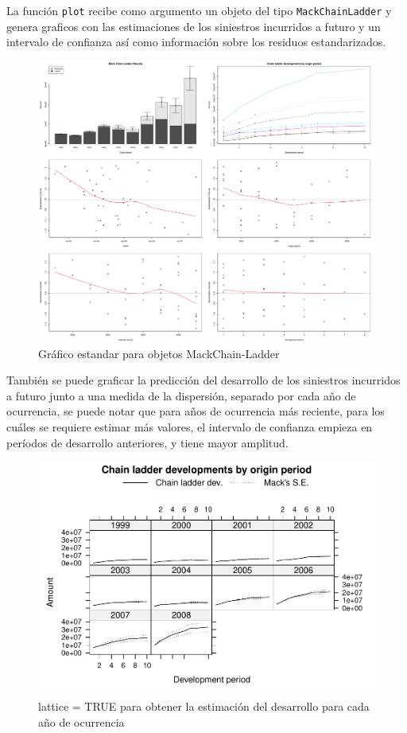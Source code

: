 \documentclass[
  12pt,
]{article}
\begin{document}
La función \texttt{plot} recibe como argumento un objeto del tipo
\texttt{MackChainLadder} y genera graficos con las estimaciones de los
siniestros incurridos a futuro y un intervalo de confianza así como
información sobre los residuos estandarizados.

\begin{figure}
\includegraphics[width=1\linewidth]{informe_files/figure-latex/unnamed-chunk-18-1} \caption{Gráfico estandar para objetos MackChain-Ladder}\label{fig:unnamed-chunk-18}
\end{figure}

También se puede graficar la predicción del desarrollo de los siniestros
incurridos a futuro junto a una medida de la dispersión, separado por
cada año de ocurrencia, se puede notar que para años de ocurrencia más
reciente, para los cuáles se requiere estimar más valores, el intervalo
de confianza empieza en períodos de desarrollo anteriores, y tiene mayor
amplitud.

\begin{figure}
\centering
\includegraphics{informe_files/figure-latex/unnamed-chunk-19-1.pdf}
\caption{lattice = TRUE para obtener la estimación del desarrollo para
cada año de ocurrencia}
\end{figure}
\end{document}
